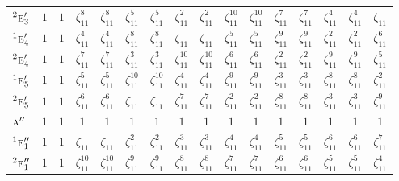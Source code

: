 \documentclass[10pt,a4paper]{article}
\numberwithin{equation}{section}
\newcommand{\irr}[1]{\text{\normalfont\scshape #1}}
\newcommand{\conjpair}[1]{{}^{#1}}
\newcommand{\rootunity}[1]{\zeta_{#1}}
\begin{document}
{\begin{longtable}{@{}lccccccccccccccc@{}}
$\conjpair{2}\irr{e}_{3}'$ & $1$ & $1$ & $\rootunity{11}^{8}$ & $\rootunity{11}^{8}$ & $\rootunity{11}^{5}$ & $\rootunity{11}^{5}$ & $\rootunity{11}^{2}$ & $\rootunity{11}^{2}$ & $\rootunity{11}^{10}$ & $\rootunity{11}^{10}$ & $\rootunity{11}^{7}$ & $\rootunity{11}^{7}$ & $\rootunity{11}^{4}$ & $\rootunity{11}^{4}$ & $\rootunity{11}$\\
$\conjpair{1}\irr{e}_{4}'$ & $1$ & $1$ & $\rootunity{11}^{4}$ & $\rootunity{11}^{4}$ & $\rootunity{11}^{8}$ & $\rootunity{11}^{8}$ & $\rootunity{11}$ & $\rootunity{11}$ & $\rootunity{11}^{5}$ & $\rootunity{11}^{5}$ & $\rootunity{11}^{9}$ & $\rootunity{11}^{9}$ & $\rootunity{11}^{2}$ & $\rootunity{11}^{2}$ & $\rootunity{11}^{6}$\\
$\conjpair{2}\irr{e}_{4}'$ & $1$ & $1$ & $\rootunity{11}^{7}$ & $\rootunity{11}^{7}$ & $\rootunity{11}^{3}$ & $\rootunity{11}^{3}$ & $\rootunity{11}^{10}$ & $\rootunity{11}^{10}$ & $\rootunity{11}^{6}$ & $\rootunity{11}^{6}$ & $\rootunity{11}^{2}$ & $\rootunity{11}^{2}$ & $\rootunity{11}^{9}$ & $\rootunity{11}^{9}$ & $\rootunity{11}^{5}$\\
$\conjpair{1}\irr{e}_{5}'$ & $1$ & $1$ & $\rootunity{11}^{5}$ & $\rootunity{11}^{5}$ & $\rootunity{11}^{10}$ & $\rootunity{11}^{10}$ & $\rootunity{11}^{4}$ & $\rootunity{11}^{4}$ & $\rootunity{11}^{9}$ & $\rootunity{11}^{9}$ & $\rootunity{11}^{3}$ & $\rootunity{11}^{3}$ & $\rootunity{11}^{8}$ & $\rootunity{11}^{8}$ & $\rootunity{11}^{2}$\\
$\conjpair{2}\irr{e}_{5}'$ & $1$ & $1$ & $\rootunity{11}^{6}$ & $\rootunity{11}^{6}$ & $\rootunity{11}$ & $\rootunity{11}$ & $\rootunity{11}^{7}$ & $\rootunity{11}^{7}$ & $\rootunity{11}^{2}$ & $\rootunity{11}^{2}$ & $\rootunity{11}^{8}$ & $\rootunity{11}^{8}$ & $\rootunity{11}^{3}$ & $\rootunity{11}^{3}$ & $\rootunity{11}^{9}$\\
$\irr{a}''$ & $1$ & $1$ & $1$ & $1$ & $1$ & $1$ & $1$ & $1$ & $1$ & $1$ & $1$ & $1$ & $1$ & $1$ & $1$\\
$\conjpair{1}\irr{e}_{1}''$ & $1$ & $1$ & $\rootunity{11}$ & $\rootunity{11}$ & $\rootunity{11}^{2}$ & $\rootunity{11}^{2}$ & $\rootunity{11}^{3}$ & $\rootunity{11}^{3}$ & $\rootunity{11}^{4}$ & $\rootunity{11}^{4}$ & $\rootunity{11}^{5}$ & $\rootunity{11}^{5}$ & $\rootunity{11}^{6}$ & $\rootunity{11}^{6}$ & $\rootunity{11}^{7}$\\
$\conjpair{2}\irr{e}_{1}''$ & $1$ & $1$ & $\rootunity{11}^{10}$ & $\rootunity{11}^{10}$ & $\rootunity{11}^{9}$ & $\rootunity{11}^{9}$ & $\rootunity{11}^{8}$ & $\rootunity{11}^{8}$ & $\rootunity{11}^{7}$ & $\rootunity{11}^{7}$ & $\rootunity{11}^{6}$ & $\rootunity{11}^{6}$ & $\rootunity{11}^{5}$ & $\rootunity{11}^{5}$ & $\rootunity{11}^{4}$\\

\end{longtable}}
\end{document}
